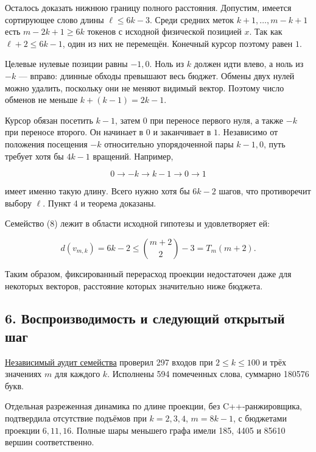 \documentclass[
  11pt,
  a4paper,
]{article}
\begin{document}
Осталось доказать нижнюю границу полного расстояния. Допустим, имеется
сортирующее слово длины \(\ell\le6k-3\). Среди средних меток
\(k+1,\ldots,m-k+1\) есть \(m-2k+1\ge6k\) токенов с исходной физической
позицией \(x\). Так как \(\ell+2\le6k-1\), один из них не перемещён.
Конечный курсор поэтому равен \(1\).

Целевые нулевые позиции равны \(-1,0\). Ноль из \(k\) должен идти влево,
а ноль из \(-k\) --- вправо: длинные обходы превышают весь бюджет.
Обмены двух нулей можно удалить, поскольку они не меняют видимый вектор.
Поэтому число обменов не меньше \(k+(k-1)=2k-1\).

Курсор обязан посетить \(k-1\), затем \(0\) при переносе первого нуля, а
также \(-k\) при переносе второго. Он начинает в \(0\) и заканчивает в
\(1\). Независимо от положения посещения \(-k\) относительно
упорядоченной пары \(k-1,0\), путь требует хотя бы \(4k-1\) вращений.
Например,

\[0\longrightarrow-k\longrightarrow k-1\longrightarrow0\longrightarrow1\]

имеет именно такую длину. Всего нужно хотя бы \(6k-2\) шагов, что
противоречит выбору \(\ell\). Пункт 4 и теорема доказаны.

Семейство (8) лежит в области исходной гипотезы и удовлетворяет ей:

\[d(v_{m,k})=6k-2\le\binom{m+2}{2}-3=T_m(m+2).\]

Таким образом, фиксированный перерасход проекции недостаточен даже для
некоторых векторов, расстояние которых значительно ниже бюджета.

\hypertarget{ux432ux43eux441ux43fux440ux43eux438ux437ux432ux43eux434ux438ux43cux43eux441ux442ux44c-ux438-ux441ux43bux435ux434ux443ux44eux449ux438ux439-ux43eux442ux43aux440ux44bux442ux44bux439-ux448ux430ux433}{%
\subsection{6. Воспроизводимость и следующий открытый
шаг}\label{ux432ux43eux441ux43fux440ux43eux438ux437ux432ux43eux434ux438ux43cux43eux441ux442ux44c-ux438-ux441ux43bux435ux434ux443ux44eux449ux438ux439-ux43eux442ux43aux440ux44bux442ux44bux439-ux448ux430ux433}}

\href{scripts/audit_multiset_marked_zero_barrier.py}{Независимый аудит
семейства} проверил 297 входов при \(2\le k\le100\) и трёх значениях
\(m\) для каждого \(k\). Исполнены 594 помеченных слова, суммарно 180576
букв.

Отдельная разреженная динамика по длине проекции, без C++-ранжировщика,
подтвердила отсутствие подъёмов при \(k=2,3,4\), \(m=8k-1\), с бюджетами
проекции \(6,11,16\). Полные шары меньшего графа имели 185, 4405 и 85610
вершин соответственно.
\end{document}
